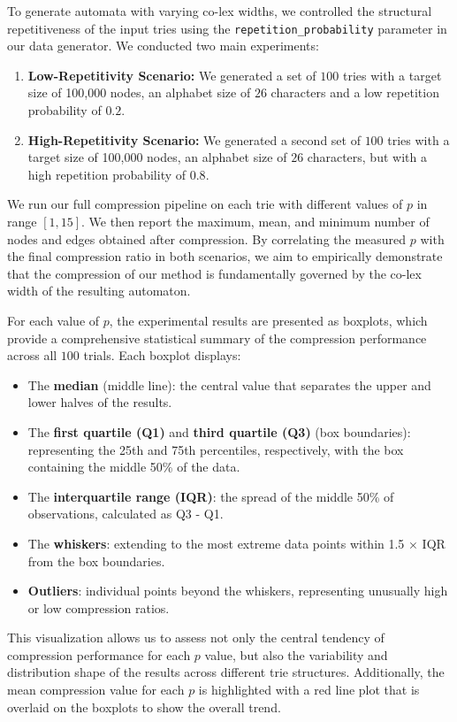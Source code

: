 To generate automata with varying co-lex widths, we controlled the structural repetitiveness of the input tries using the \texttt{repetition\_probability} parameter in our data generator. We conducted two main experiments:

\begin{enumerate}
    \item \textbf{Low-Repetitivity Scenario:} We generated a set of $100$ tries with a target size of 100,000 nodes, an alphabet size of $26$ characters and a low repetition probability of $0.2$.
    \item \textbf{High-Repetitivity Scenario:} We generated a second set of $100$ tries with a target size of 100,000 nodes, an alphabet size of $26$ characters, but with a high repetition probability of $0.8$.
\end{enumerate}

We run our full compression pipeline on each trie with different values of $p$ in range $[1, 15]$. We then report the maximum, mean, and minimum number of nodes and edges obtained after compression. By correlating the measured $p$ with the final compression ratio in both scenarios, we aim to empirically demonstrate that the compression of our method is fundamentally governed by the co-lex width of the resulting automaton.

For each value of $p$, the experimental results are presented as boxplots, which provide a comprehensive statistical summary of the compression performance across all $100$ trials. Each boxplot displays:
\begin{itemize}
    \item The \textbf{median} (middle line): the central value that separates the upper and lower halves of the results.
    \item The \textbf{first quartile (Q1)} and \textbf{third quartile (Q3)} (box boundaries): representing the 25th and 75th percentiles, respectively, with the box containing the middle 50\% of the data.
    \item The \textbf{interquartile range (IQR)}: the spread of the middle 50\% of observations, calculated as Q3 - Q1.
    \item The \textbf{whiskers}: extending to the most extreme data points within 1.5 × IQR from the box boundaries.
    \item \textbf{Outliers}: individual points beyond the whiskers, representing unusually high or low compression ratios.
\end{itemize}
This visualization allows us to assess not only the central tendency of compression performance for each $p$ value, but also the variability and distribution shape of the results across different trie structures. Additionally, the mean compression value for each $p$ is highlighted with a red line plot that is overlaid on the boxplots to show the overall trend.

